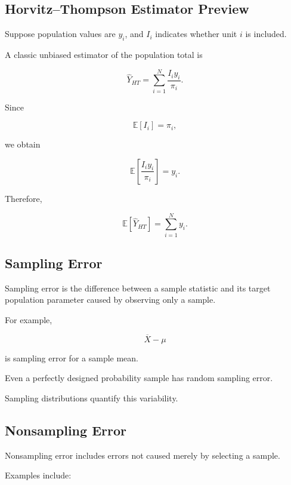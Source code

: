 \subsection{Horvitz--Thompson Estimator Preview}
\label{subsec:horvitz-thompson-preview}

Suppose population values are \(y_i\), and \(I_i\) indicates whether unit
\(i\) is included.

A classic unbiased estimator of the population total is

\[
\boxed{
\widehat{Y}_{HT}
=
\sum_{i=1}^{N}
\frac{I_iy_i}{\pi_i}.
}
\]

Since

\[
\mathbb{E}[I_i]=\pi_i,
\]

we obtain

\[
\mathbb{E}
\left[
\frac{I_iy_i}{\pi_i}
\right]
=
y_i.
\]

Therefore,

\[
\boxed{
\mathbb{E}[\widehat{Y}_{HT}]
=
\sum_{i=1}^{N}y_i.
}
\]

\subsection{Sampling Error}
\label{subsec:sampling-error}

Sampling error is the difference between a sample statistic and its
target population parameter caused by observing only a sample.

For example,

\[
\boxed{
\overline{X}-\mu
}
\]

is sampling error for a sample mean.

Even a perfectly designed probability sample has random sampling error.

Sampling distributions quantify this variability.

\subsection{Nonsampling Error}
\label{subsec:nonsampling-error}

Nonsampling error includes errors not caused merely by selecting a
sample.

Examples include:

